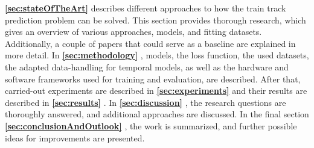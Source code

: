\noindent\textbf{\ref{sec:stateOfTheArt}} \textbf{} describes different approaches to how the train track prediction problem can be solved.
This section provides thorough research, which gives an overview of various approaches, models, and fitting datasets.
Additionally, a couple of papers that could serve as a baseline are explained in more detail.
In \textbf{\ref{sec:methodology}} \textbf{}, models, the loss function, the used datasets, the adapted data-handling for temporal models, as well as the hardware and software frameworks used for training and evaluation, are described.
After that, carried-out experiments are described in \textbf{\ref{sec:experiments}} \textbf{} and their results are described in \textbf{\ref{sec:results}} \textbf{}.
In \textbf{\ref{sec:discussion}} \textbf{}, the research questions are thoroughly answered, and additional approaches are discussed.
In the final section \textbf{\ref{sec:conclusionAndOutlook}} \textbf{}, the work is summarized, and further possible ideas for improvements are presented.
